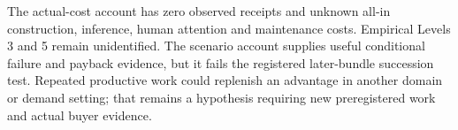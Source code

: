 The actual-cost account has zero observed receipts and unknown all-in construction, inference, human attention and maintenance costs. Empirical Levels 3 and 5 remain unidentified. The scenario account supplies useful conditional failure and payback evidence, but it fails the registered later-bundle succession test. Repeated productive work could replenish an advantage in another domain or demand setting; that remains a hypothesis requiring new preregistered work and actual buyer evidence.

